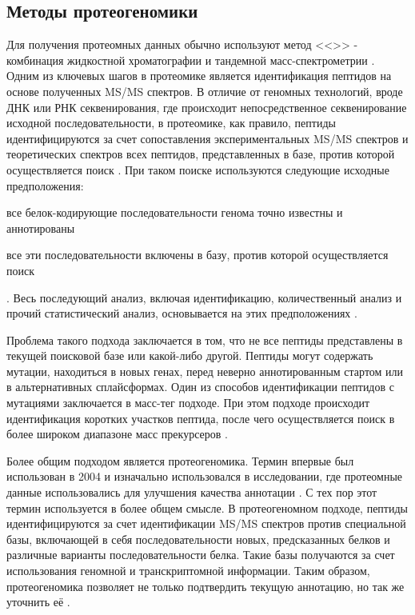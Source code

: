 
\subsection{Методы протеогеномики}
Для получения протеомных данных обычно используют метод <<>> - комбинация жидкостной хроматографии и тандемной масс-спектрометрии \cite{bantscheff2012quantitative}. Одним из ключевых шагов в протеомике является идентификация пептидов на основе полученных MS/MS спектров. В отличие от геномных технологий, вроде ДНК или РНК секвенирования, где происходит непосредственное секвенирование исходной последовательности, в протеомике, как правило, пептиды идентифицируются за счет сопоставления экспериментальных MS/MS спектров и теоретических спектров всех пептидов, представленных в базе, против которой осуществляется поиск \cite{nesvizhskii2010survey}.
При таком поиске используются следующие исходные предположения: 
\begin{inparaenum}
    \item все белок-кодирующие последовательности генома точно известны и аннотированы
    \item все эти последовательности включены в базу, против которой осуществляется поиск
\end{inparaenum}.
Весь последующий анализ, включая идентификацию, количественный анализ и прочий статистический анализ, основывается на этих предположениях \cite{nesvizhskii2005interpretation}.

Проблема такого подхода заключается в том, что не все пептиды представлены в текущей поисковой базе или какой-либо другой. Пептиды могут содержать мутации, находиться в новых генах, перед неверно аннотированным стартом или в альтернативных сплайсформах. 
Один из способов идентификации пептидов с мутациями заключается в масс-тег подходе. При этом подходе происходит идентификация коротких участков пептида, после чего осуществляется поиск в более широком диапазоне масс прекурсеров \cite{dasari2010tagrecon}. 

Более общим подходом является протеогеномика. Термин впервые был использован в 2004 и изначально использовался в исследовании, где протеомные данные использовались для улучшения качества аннотации \cite{jaffe2004proteogenomic}. С тех пор этот термин используется в более общем смысле. В протеогеномном подходе, пептиды идентифицируются за счет идентификации MS/MS спектров против специальной базы, включающей в себя последовательности новых, предсказанных белков и различные варианты последовательности белка. Такие базы получаются за счет использования геномной и транскриптомной информации. Таким образом, протеогеномика позволяет не только подтвердить текущую аннотацию, но так же уточнить её \cite{nesvizhskii2014proteogenomics}. 


